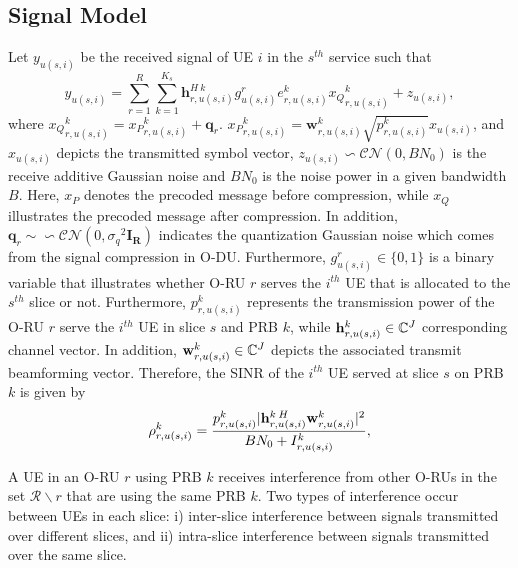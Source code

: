 \documentclass[lettersize,journal]{IEEEtran}
\begin{document}
\subsection{Signal Model}
Let $y_{u(s,i)} $ be the received signal of UE $i$ in the $s^{th}$ service such that
\begin{equation}\label{eq2}
y_{u(s,i)} = \sum_{r = 1}^{R}\sum_{k=1}^{K_s} \boldsymbol{h}^{H \: k}_{r,u(s,i)} g_{u(s,i)}^r e^k_{r,u(s,i)}{x_Q}^k_{r,u(s,i)}+ z_{u(s,i)},
\end{equation}
where ${x_Q}^k_{r,u(s,i)} ={x_P}^k_{r,u(s,i)}+ \boldsymbol{q}_{r}$. ${x_P}^k_{r,u(s,i)}= \boldsymbol{w}^k_{r,u(s,i)}\sqrt{p^{k}_{r,u(s,i)}} x_{u(s,i)} $, and  $ x_{u(s,i)}$ depicts the transmitted symbol vector, $z_{u(s,i)}\backsim \mathcal{CN}(0,BN_0)$ is the receive additive Gaussian noise and $BN_0$ is the noise power in a given bandwidth $B$.
Here, ${x_P}$ denotes the precoded message before compression, while ${x_Q}$ illustrates the precoded message after compression.%
In addition, $\boldsymbol{q}_{r} \sim \backsim \mathcal{CN}(0,{\sigma_q}^2\boldsymbol{I_{R}} )$ indicates the quantization Gaussian noise which comes from the signal compression in O-DU.
Furthermore, $g_{u(s,i)}^r \in \{0,1\}$ is a binary variable that illustrates whether O-RU $r$ serves the $i^{th}$ UE that is allocated to the $s^{th}$ slice or not.
Furthermore, $p_{r,u(s,i)}^{k}$ represents the transmission power of the O-RU $r$ serve the $i^{th}$ UE in slice $s$ and PRB $k$, while
${\bold{h}_{r,u(s,i)}^{k}} \in \mathbb{C}^{J}$ corresponding channel vector.
In addition, $\bold{w}_{r,u(s,i)}^{k} \in \mathbb{C}^{J}$ depicts the associated transmit beamforming vector.
Therefore, the SINR of the $i^{th}$ UE served at slice $s$ on PRB $k$ is given by
\begin{equation}\label{eq1}
\rho_{r,u(s,i)}^{k} =  \frac{p_{r,u(s,i)}^{k}|{\bold{h}_{r,u(s,i)}^{k \: H}} \bold{w}_{r,u(s,i)}^{k}|^2}{BN_0 + I_{r,u(s,i)}^{k}},
\end{equation}

A UE in an O-RU $r$ using PRB $k$ receives interference from other O-RUs in the set $\mathcal{R}\backslash r$ that are using the same PRB $k$. Two types of interference occur between UEs in each slice: i) inter-slice interference between signals transmitted over different slices, and ii) intra-slice interference between signals transmitted over the same slice.%
 
\end{document}
